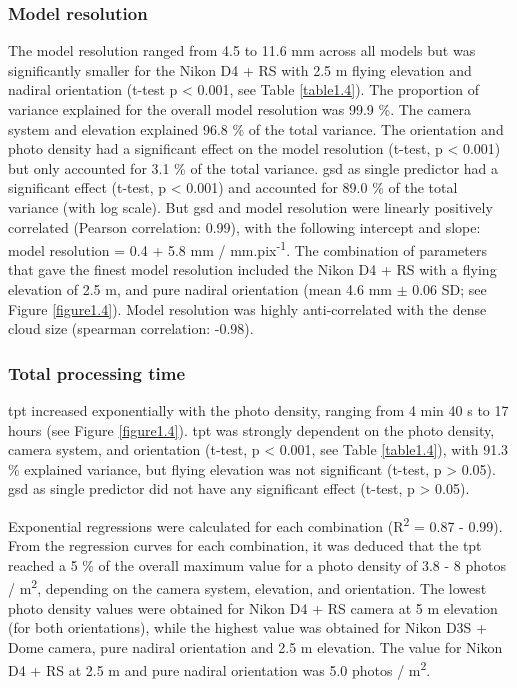 \subsubsection{Model resolution}\label{chapitre1_3.1.3}
The model resolution ranged from 4.5 to 11.6 mm across all models but was significantly smaller for the Nikon D4 + RS with 2.5 m flying elevation and nadiral orientation (t-test p < 0.001, see Table \ref{table1.4}). The proportion of variance explained for the overall model resolution was 99.9 \%. The camera system and elevation explained 96.8 \% of the total variance. The orientation and photo density had a significant effect on the model resolution (t-test, p < 0.001) but only accounted for 3.1 \% of the total variance. \acrshort{gsd} as single predictor had a significant effect (t-test, p < 0.001) and accounted for 89.0 \% of the total variance (with log scale). But \acrshort{gsd} and model resolution were linearly positively correlated (Pearson correlation: 0.99), with the following intercept and slope: model resolution = 0.4 + 5.8 mm / mm.pix\textsuperscript{-1}. The combination of parameters that gave the finest model resolution included the Nikon D4 + RS with a flying elevation of 2.5 m, and pure nadiral orientation (mean 4.6 mm $\pm$ 0.06 SD; see Figure \ref{figure1.4}). Model resolution was highly anti-correlated with the dense cloud size (spearman correlation: -0.98).

\subsubsection{Total processing time}\label{chapitre1_3.1.4}
\acrshort{tpt} increased exponentially with the photo density, ranging from 4 min 40 s to 17 hours (see Figure \ref{figure1.4}). \acrshort{tpt} was strongly dependent on the photo density, camera system, and orientation (t-test, p < 0.001, see Table \ref{table1.4}), with 91.3 \% explained variance, but flying elevation was not significant (t-test, p > 0.05). \acrshort{gsd} as single predictor did not have any significant effect (t-test, p > 0.05).

Exponential regressions were calculated for each combination (R\textsuperscript{2} = 0.87 - 0.99). From the regression curves for each combination, it was deduced that the \acrshort{tpt} reached a 5 \% of the overall maximum value for a photo density of 3.8 - 8 photos / m\textsuperscript{2}, depending on the camera system, elevation, and orientation. The lowest photo density values were obtained for Nikon D4 + RS camera at 5 m elevation (for both orientations), while the highest value was obtained for Nikon D3S + Dome camera, pure nadiral orientation and 2.5 m elevation. The value for Nikon D4 + RS at 2.5 m and pure nadiral orientation was 5.0 photos / m\textsuperscript{2}.

